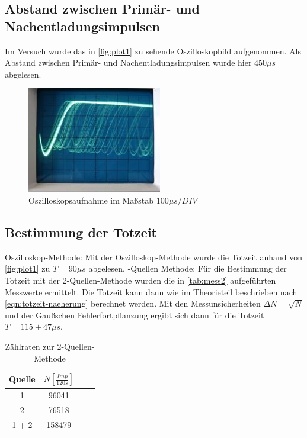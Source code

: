 \newpage
\subsection{Abstand zwischen Primär- und Nachentladungsimpulsen}
Im Versuch wurde das in \autoref{fig:plot1} zu sehende Oszilloskopbild aufgenommen. Als Abstand zwischen Primär- und Nachentladungsimpulsen wurde hier $450 \mu s$ abgelesen.
\begin{figure}
  \centering
  \includegraphics{content/oszill.JPG}
  \caption{Oszilloskopsaufnahme im Maßstab $100\mu s/DIV$ \cite{sample}}
  \label{fig:plot1}
\end{figure}

\subsection{Bestimmung der Totzeit}
Oszilloskop-Methode:
Mit der Oszilloskop-Methode wurde die Totzeit anhand von \autoref{fig:plot1} zu $T=90 \mu s$ abgelesen.
\newline
{}-Quellen Methode:
Für die Bestimmung der Totzeit mit der 2-Quellen-Methode wurden die in \autoref{tab:mess2} aufgeführten Messwerte ermittelt. Die Totzeit kann dann wie im Theorieteil beschrieben nach \autoref{eqn:totzeit-naeherung} berechnet werden. Mit den Messunsicherheiten $\Delta N = \sqrt{N}$ und der Gaußschen Fehlerfortpflanzung ergibt sich dann für die Totzeit $T=115 \pm 47 \mu s$.
\begin{table}
  \centering
  \caption{Zählraten zur 2-Quellen-Methode}
\label{tab:mess2}
  \begin{tabular}{c c c c}
  \toprule
  Quelle & $N [\frac{Imp}{120s}]$ \\
  \midrule
  1     & 96041  \\
  2     & 76518 \\
  1 + 2 & 158479 \\
  \bottomrule
  \end{tabular}
  \end{table}
  \newpage
